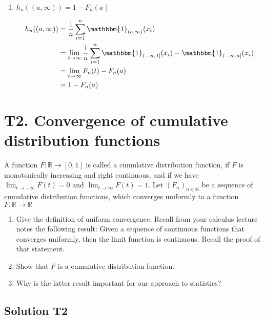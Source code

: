 \documentclass[12pt]{article}
\begin{document}
\begin{enumerate}[label= \textbf{\arabic*.   }]
        \item $ h_n((a,\infty)) = 1-F_n(a) $

    \begin{align*}
        h_n((a,\infty)) &= \frac{1}{n}\sum_{i=1}^n \mathbbm{1}_{(a,\infty)}(x_i)\\
        &= \lim_{t\rightarrow \infty}\frac{1}{n}\sum_{i=1}^n \mathbbm{1}_{(-\infty,t]}(x_i)- \mathbbm{1}_{(-\infty,a]}(x_i)\\
        &= \lim_{t\rightarrow \infty}F_n(t)-F_n(a)\\
        &= 1-F_n(a)
    \end{align*}
\end{enumerate}

  



\newpage

\section*{T2. Convergence of cumulative distribution functions}
A function $F : \mathbb{R} \rightarrow [0, 1]$ is called a cumulative distribution function, if $F$ is monotonically increasing and right continuous, and if we have $\lim_{t\rightarrow -\infty} F(t) = 0$ and $\lim_{t\rightarrow \infty} F(t) = 1$. Let $(F_n)_{n\in  \mathbb{N} }$ be a sequence of cumulative distribution functions, which converges uniformly to a function $F : \mathbb{R} \rightarrow \mathbb{R}$

\begin{enumerate}
\item  Give the definition of uniform convergence. Recall from your calculus lecture notes the following result: Given a sequence of continuous functions that converges uniformly, then the limit function is continuous. Recall the proof of that statement.
\item  Show that $F$ is a cumulative distribution function.
\item  Why is the latter result important for our approach to statistics?
\end{enumerate}

\subsection*{Solution T2}
\end{document}
